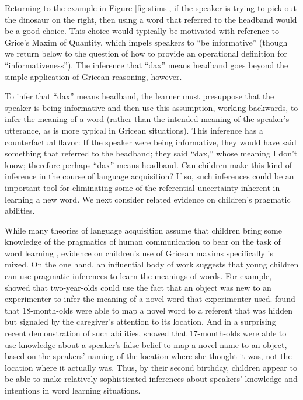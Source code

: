 \documentclass[man,noapacite]{apa2}
\begin{document}
Returning to the example in Figure \ref{fig:stims}, if the speaker is trying to pick out the dinosaur on the right, then using a word that referred to the {\sc headband} would be a good choice. This choice would typically be motivated with reference to Grice's Maxim of Quantity, which impels speakers to ``be informative'' (though we return below to the question of how to provide an operational definition for ``informativeness''). The inference that ``dax'' means {\sc headband} goes beyond the simple application of Gricean reasoning, however. 

To infer that ``dax'' means {\sc headband}, the learner must presuppose that the speaker is being informative and then use this assumption, working backwards, to infer the meaning of a word (rather than the intended meaning of the speaker's utterance, as is more typical in Gricean situations). This inference has a counterfactual flavor: If the speaker were being informative, they would have said something that referred to the {\sc headband}; they said ``dax,'' whose meaning I don't know; therefore perhaps ``dax'' means {\sc headband}. Can children make this kind of inference in the course of language acquisition? If so, such inferences could be an important tool for eliminating some of the referential uncertainty inherent in learning a new word. We next consider related evidence on children's pragmatic abilities.

While many theories of language acquisition assume that children bring some knowledge of the pragmatics of human communication to bear on the task of word learning \cite{bloom2002,clark2003,tomasello2003}, evidence on children's use of Gricean maxims specifically is mixed. On the one hand, an influential body of work suggests that young children can use pragmatic inferences to learn the meanings of words. For example,  showed that two-year-olds could use the fact that an object was new to an experimenter to infer the meaning of a novel word that experimenter used.  found that 18-month-olds were able to map a novel word to a referent that was hidden but signaled by the caregiver's attention to its location. And in a surprising recent demonstration of such abilities,  showed that 17-month-olds were able to use knowledge about a speaker's false belief to map a novel name to an object, based on the speakers' naming of the location where she thought it was, not the location where it actually was. Thus, by their second birthday, children appear to be able to make relatively sophisticated inferences about speakers' knowledge and intentions in word learning situations.
\end{document}
